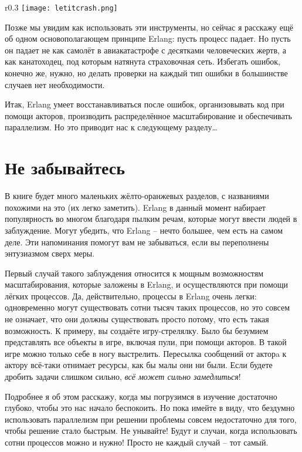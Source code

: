 \begin{wrapfigure}{r}{0.3\linewidth}
    \texttt{[image: letitcrash.png]}
\end{wrapfigure}
Позже мы увидим как использовать эти инструменты, но сейчас я расскажу ещё об одном основополагающем принципе Erlang: пусть процесс падает.
Но пусть он падает не как самолёт в авиакатастрофе с десятками человеческих жертв, а как канатоходец, под которым натянута страховочная сеть.
Избегать ошибок, конечно же, нужно, но делать проверки на каждый тип ошибки в большинстве случаев нет необходимости.

Итак, Erlang умеет восстанавливаться после ошибок, организовывать код при помощи акторов, производить распределённое масштабирование и обеспечивать параллелизм.
Но это приводит нас к следующему разделу\ldots

\section{Не забывайтесь}
\label{dont-drink-too-much-kool-aid}
В книге будет много маленьких жёлто\--оранжевых разделов, с названиями похожими на это (их легко заметить).
Erlang в данный момент набирает популярность во многом благодаря пылким речам, которые могут ввести людей в заблуждение.
Могут убедить, что Erlang \--- нечто большее, чем есть на самом деле.
Эти напоминания помогут вам не забываться, если вы переполнены энтузиазмом сверх меры.

Первый случай такого заблуждения относится к мощным возможностям масштабирования, которые заложены в Erlang, и осуществляются при помощи лёгких процессов.
Да, действительно, процессы в Erlang очень легки: одновременно могут существовать сотни тысяч таких процессов, но это совсем не означает, что они должны существовать просто потому, что есть такая возможность.
К примеру, вы создаёте игру\--стрелялку.
Было бы безумием представлять все объекты в игре, включая пули, при помощи акторов.
В такой игре можно только себе в ногу выстрелить.
Пересылка сообщений от акторa к актору всё\--таки отнимает ресурсы, как бы малы они ни были.
Если будете дробить задачи слишком сильно, \emph{всё может сильно замедлиться}!

Подробнее я об этом расскажу, когда мы погрузимся в изучение достаточно глубоко, чтобы это нас начало беспокоить.
Но пока имейте в виду, что бездумно использовать параллелизм при решении проблемы совсем недостаточно для того, чтобы решение стало быстрым.
Не унывайте!
Будут и случаи, когда использовать сотни процессов можно и нужно!
Просто не каждый случай \--- тот самый.

